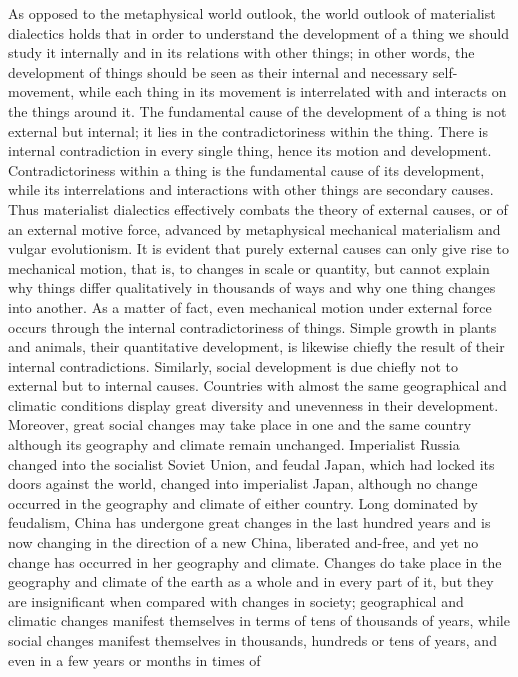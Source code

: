 \documentclass{article}
\begin{document}
As opposed to the metaphysical world outlook, the world outlook of
materialist dialectics holds that in order to understand the development
of a thing we should study it internally and in its relations with other
things; in other words, the development of things should be seen as their
internal and necessary self-movement, while each thing in its movement is
interrelated with and interacts on the things around it. The fundamental
cause of the development of a thing is not external but internal; it lies
in the contradictoriness within the thing. There is internal contradiction
in every single thing, hence its motion and development. Contradictoriness
within a thing is the fundamental cause of its development, while its
interrelations and interactions with other things are secondary causes.
Thus materialist dialectics effectively combats the theory of external
causes, or of an external motive force, advanced by metaphysical
mechanical materialism and vulgar evolutionism. It is evident that purely
external causes can only give rise to mechanical motion, that is, to
changes in scale or quantity, but cannot explain why things differ
qualitatively in thousands of ways and why one thing changes into another.
As a matter of fact, even mechanical motion under external force occurs
through the internal contradictoriness of things. Simple growth in plants
and animals, their quantitative development, is likewise chiefly the
result of their internal contradictions. Similarly, social development is
due chiefly not to external but to internal causes. Countries with almost
the same geographical and climatic conditions display great diversity and
unevenness in their development. Moreover, great social changes may take
place in one and the same country although its geography and climate
remain unchanged. Imperialist Russia changed into the socialist Soviet
Union, and feudal Japan, which had locked its doors against the world,
changed into imperialist Japan, although no change occurred in the
geography and climate of either country. Long dominated by feudalism,
China has undergone great changes in the last hundred years and is now
changing in the direction of a new China, liberated and-free, and yet no
change has occurred in her geography and climate. Changes do take place in
the geography and climate of the earth as a whole and in every part of it,
but they are insignificant when compared with changes in society;
geographical and climatic changes manifest themselves in terms of tens of
thousands of years, while social changes manifest themselves in thousands,
hundreds or tens of years, and even in a few years or months in times of
\end{document}

